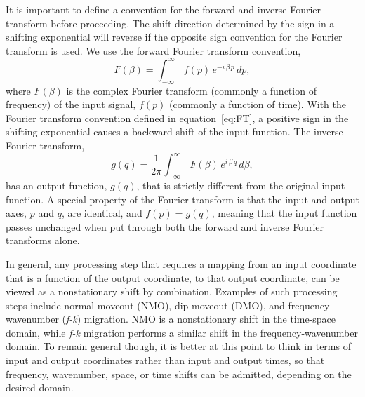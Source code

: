 It is important to define a convention for the forward and inverse Fourier transform before proceeding.
The shift-direction determined by the sign in a shifting exponential will reverse if the opposite sign convention for the Fourier transform is used.
We use the forward Fourier transform convention,
\begin{equation}
\label{eq:FT}
	F \left( \beta \right) = \int_{-\infty}^{\infty} \, f \left( p \right) \, e^{-i \, \beta \, p} \, dp,
\end{equation}
\noindent where $F(\beta )$ is the complex Fourier transform (commonly a function of frequency) of the input signal, $f(p)$ (commonly a function of time). 
With the Fourier transform convention defined in equation~\ref{eq:FT}, a positive sign in the shifting exponential causes a backward shift of the input function. 
The inverse Fourier transform, 
\begin{equation}
\label{eq:IFT}
	g \left( q  \right) = \frac{1}{2\pi }\int_{-\infty}^{\infty} \, F \left( \beta \right) \, e^{i \, \beta \, q } \, d\beta ,
\end{equation}
\noindent 
has an output function, $g(q)$, that is strictly different from the original input function.  A special property of the Fourier transform is that the input and output axes, $p$ and $q$, are identical, and $f(p)=g(q)$, meaning that the input function passes unchanged when put through both the forward and inverse Fourier transforms alone.  

In general, any processing step that requires a mapping from an input coordinate that is a function of the output coordinate, to that output coordinate, can be viewed as a nonstationary shift by combination.  Examples of such processing steps include normal moveout (NMO), dip-moveout (DMO), and frequency-wavenumber (\textit{f-k}) migration.
NMO is a nonstationary shift in the time-space domain, while \textit{f-k} migration performs a similar shift in the frequency-wavenumber domain. 
To remain general though, it is better at this point to think in terms of input and output coordinates rather than input and output times, so that frequency, wavenumber, space, or time shifts can be admitted, depending on the desired domain.


